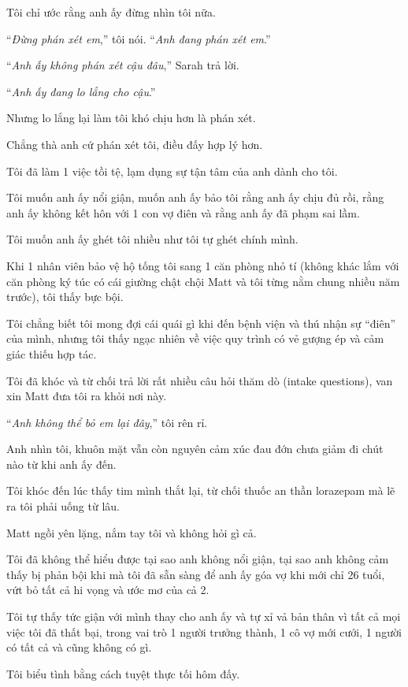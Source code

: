 \documentclass{book}
\numberwithin{equation}{section}
\begin{document}
Tôi chỉ ước rằng anh ấy đừng nhìn tôi nữa.

%
``\textit{Đừng phán xét em},'' tôi nói. ``\textit{Anh đang phán xét em}.''

%
``\textit{Anh ấy không phán xét cậu đâu},'' Sarah trả lời.

``\textit{Anh ấy đang lo lắng cho cậu}.''

%
Nhưng lo lắng lại làm tôi khó chịu hơn là phán xét.

Chẳng thà anh cứ phán xét tôi, điều đấy hợp lý hơn.

Tôi đã làm 1 việc tồi tệ, lạm dụng sự tận tâm của anh dành cho tôi.

Tôi muốn anh ấy nổi giận, muốn anh ấy bảo tôi rằng anh ấy chịu đủ rồi, rằng anh ấy không kết hôn với 1 con vợ điên và rằng anh ấy đã phạm sai lầm.

Tôi muốn anh ấy ghét tôi nhiều như tôi tự ghét chính mình.

%
Khi 1 nhân viên bảo vệ hộ tống tôi sang 1 căn phòng nhỏ tí (không khác lắm với căn phòng ký túc có cái giường chật chội Matt và tôi từng nằm chung nhiều năm trước), tôi thấy bực bội.

Tôi chẳng biết tôi mong đợi cái quái gì khi đến bệnh viện và thú nhận sự ``điên'' của mình, nhưng tôi thấy ngạc nhiên về việc quy trình có vẻ gượng ép và cảm giác thiếu hợp tác.

Tôi đã khóc và từ chối trả lời rất nhiều câu hỏi thăm dò (intake questions), van xin Matt đưa tôi ra khỏi nơi này.

%
``\textit{Anh không thể bỏ em lại đây},'' tôi rên rỉ.

%
Anh nhìn tôi, khuôn mặt vẫn còn nguyên cảm xúc đau đớn chưa giảm đi chút nào từ khi anh ấy đến.

%
Tôi khóc đến lúc thấy tim mình thắt lại, từ chối thuốc an thần lorazepam mà lẽ ra tôi phải uống từ lâu.

Matt ngồi yên lặng, nắm tay tôi và không hỏi gì cả.

%
Tôi đã không thể hiểu được tại sao anh không nổi giận, tại sao anh không cảm thấy bị phản bội khi mà tôi đã sẵn sàng để anh ấy góa vợ khi mới chỉ 26 tuổi, vứt bỏ tất cả hi vọng và ước mơ của cả 2.

Tôi tự thấy tức giận với mình thay cho anh ấy và tự xỉ vả bản thân vì tất cả mọi việc tôi đã thất bại, trong vai trò 1 người trưởng thành, 1 cô vợ mới cưới, 1 người có tất cả và cũng không có gì.

Tôi biểu tình bằng cách tuyệt thực tối hôm đấy.
\end{document}
